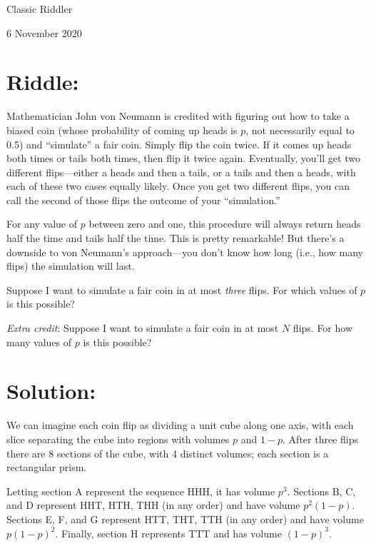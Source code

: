 \documentclass{article}
\begin{document}
\pagestyle{empty} %

\begin{center}
{\LARGE Classic Riddler}

\vspace{0.15in}

{\Large 6 November 2020}
\end{center}


\section*{Riddle:}

Mathematician John von Neumann is credited with figuring out how to take a biased coin (whose probability of coming up heads is $p$, not necessarily equal to 0.5) and ``simulate'' a fair coin.
Simply flip the coin twice.
If it comes up heads both times or tails both times, then flip it twice again.
Eventually, you'll get two different flips---either a heads and then a tails, or a tails and then a heads, with each of these two cases equally likely.
Once you get two different flips, you can call the second of those flips the outcome of your ``simulation.''

For any value of $p$ between zero and one, this procedure will always return heads half the time and tails half the time.
This is pretty remarkable!
But there's a downside to von Neumann's approach---you don't know how long (i.e., how many flips) the simulation will last.

Suppose I want to simulate a fair coin in at most \textit{three} flips.
For which values of $p$ is this possible?

\textit{Extra credit}: Suppose I want to simulate a fair coin in at most $N$ flips. For how many values of $p$ is this possible?


\section*{Solution:}

We can imagine each coin flip as dividing a unit cube along one axis, with each slice separating the cube into regions with volumes $p$ and $1-p$.
After three flips there are 8 sections of the cube, with 4 distinct volumes; each section is a rectangular prism.

Letting section A represent the sequence HHH, it has volume $p^{3}$.
Sections B, C, and D represent HHT, HTH, THH (in any order) and have volume $p^{2}(1-p)$.
Sections E, F, and G represent HTT, THT, TTH (in any order) and have volume $p(1-p)^{2}$.
Finally, section H represents TTT and has volume $(1-p)^{3}$.
\end{document}
